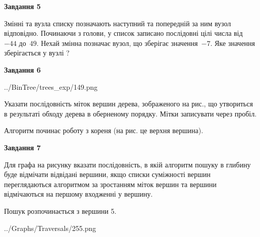 \documentclass[12pt, ukrainian]{article}
\begin{document}
{\begin {large}
{\begin {center}\textbf{Завдання 5}\end {center}}\par
Змінні  та  вузла списку позначають наступний та попередній за ним вузол відповідно. Починаючи з голови, у список записано послідовні цілі числа від~$-44$ до~$49$. Нехай змінна  позначає вузол, що зберігає значення~$-7$.
Яке значення зберігається у вузлі  ?\par
\newpage

{\begin {center}\textbf{Завдання 6}\end {center}}\par

\begin{center}
	{../BinTree/trees_exp/149.png}
\end{center}
Указати послідовність міток вершин дерева, зображеного на рис., що утвориться в результаті обходу дерева в оберненому порядку. Мітки записувати через пробіл.\par Алгоритм починає роботу з кореня (на рис. це верхня вершина).\par
\newpage

{\begin {center}\textbf{Завдання 7}\end {center}}\par
Для графа на рисунку вказати послідовність, в якій алгоритм пошуку в глибину буде відмічати відвідані вершини, якщо списки суміжності вершин переглядаються алгоритмом за зростанням міток вершин та вершини відмічаються на першому вход\-женні у вершину.\par
Пошук розпочинається з вершини 5.\par

\begin{center}
	{../Graphs/Traversals/255.png}
\end{center}\par
\newpage


\end{large}}
\end{document}
